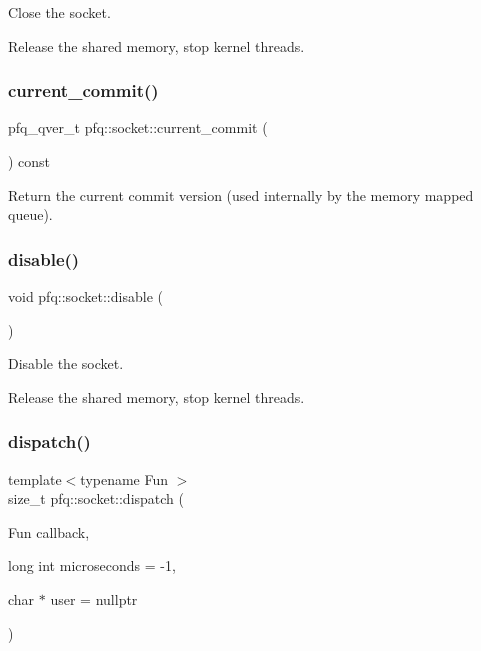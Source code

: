 Close the socket. 

Release the shared memory, stop kernel threads. \mbox{\label{classpfq_1_1socket_ada49e068e1b04c22838a3fae5d629590}} 
\subsubsection{\texorpdfstring{current\+\_\+commit()}{current\_commit()}}
{\footnotesize\ttfamily pfq\+\_\+qver\+\_\+t pfq\+::socket\+::current\+\_\+commit (\begin{DoxyParamCaption}{ }\end{DoxyParamCaption}) const\hspace{0.3cm}{\ttfamily [inline]}}



Return the current commit version (used internally by the memory mapped queue). 

\mbox{\label{classpfq_1_1socket_ac7e918bff7d1672125a8549dae750dcc}} 
\subsubsection{\texorpdfstring{disable()}{disable()}}
{\footnotesize\ttfamily void pfq\+::socket\+::disable (\begin{DoxyParamCaption}{ }\end{DoxyParamCaption})\hspace{0.3cm}{\ttfamily [inline]}}



Disable the socket. 

Release the shared memory, stop kernel threads. \mbox{\label{classpfq_1_1socket_ae6cd08be2e7c35a548a64fded4359612}} 
\subsubsection{\texorpdfstring{dispatch()}{dispatch()}}
{\footnotesize\ttfamily template$<$typename Fun $>$ \\
size\+\_\+t pfq\+::socket\+::dispatch (\begin{DoxyParamCaption}\item[{Fun}]{callback,  }\item[{long int}]{microseconds = {\ttfamily -\/1},  }\item[{char $\ast$}]{user = {\ttfamily nullptr} }\end{DoxyParamCaption})\hspace{0.3cm}{\ttfamily [inline]}}



